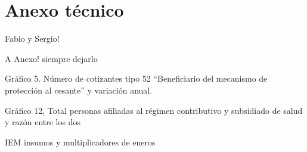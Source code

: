 \section{Anexo técnico}
Fabio y Sergio! 

A Anexo! siempre dejarlo

Gráfico 5. Número de cotizantes tipo 52
“Beneficiario del mecanismo de protección al cesante” y
variación anual.

Gráfico 12, Total personas afiliadas al régimen contributivo
y subsidiado de salud y razón entre los dos

IEM insumos y multiplicadores de eneros 